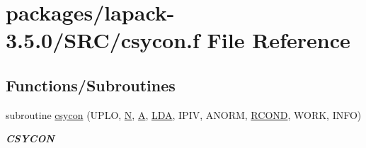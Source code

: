 \hypertarget{csycon_8f}{}\section{packages/lapack-\/3.5.0/\+S\+R\+C/csycon.f File Reference}
\label{csycon_8f}
\subsection*{Functions/\+Subroutines}
\begin{DoxyCompactItemize}
\item 
subroutine \hyperlink{group__complexSYcomputational_ga6ec6eb2e72afc7323c5125bce19473dc}{csycon} (U\+P\+L\+O, \hyperlink{polmisc_8c_a0240ac851181b84ac374872dc5434ee4}{N}, \hyperlink{classA}{A}, \hyperlink{example__user_8c_ae946da542ce0db94dced19b2ecefd1aa}{L\+D\+A}, I\+P\+I\+V, A\+N\+O\+R\+M, \hyperlink{superlu__enum__consts_8h_af00a42ecad444bbda75cde1b64bd7e72a9b5c151728d8512307565994c89919d5}{R\+C\+O\+N\+D}, W\+O\+R\+K, I\+N\+F\+O)
\begin{DoxyCompactList}\small\item\em {\bfseries C\+S\+Y\+C\+O\+N} \end{DoxyCompactList}\end{DoxyCompactItemize}

